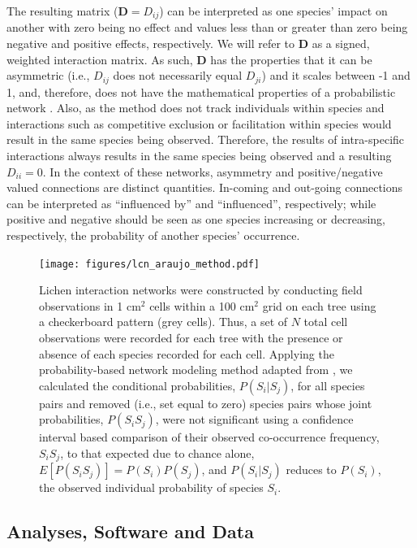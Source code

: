\documentclass[fleqn,12pt]{olplainarticle}
\begin{document}
The resulting matrix ($\mathbf{D} = D_{ij}$) can be interpreted as one
species' impact on another with zero being no effect and values less
than or greater than zero being negative and positive effects,
respectively. We will refer to $\mathbf{D}$ as a signed, weighted
interaction matrix. As such, $\mathbf{D}$ has the properties that it
can be asymmetric (i.e., $D_{ij}$ does not necessarily equal $D_{ji}$)
and it scales between -1 and 1, and, therefore, does not have the
mathematical properties of a probabilistic network
\citep{Poisot2016TheNetworks}. Also, as the method does not track
individuals within species and interactions such as competitive
exclusion or facilitation within species would result in the same
species being observed. Therefore, the results of intra-specific
interactions always results in the same species being observed and a
resulting $D_{ii} = 0$. In the context of these networks, asymmetry
and positive/negative valued connections are distinct
quantities. In-coming and out-going connections can be interpreted as
``influenced by'' and ``influenced'', respectively; while positive and
negative should be seen as one species increasing or decreasing,
respectively, the probability of another species' occurrence.

\begin{figure}[ht]
\centering
\texttt{[image: figures/lcn\_araujo\_method.pdf]}
\caption{Lichen interaction networks were constructed by conducting
  field observations in 1 cm$^2$ cells within a 100 cm$^2$ grid on each
  tree using a checkerboard pattern (grey cells). Thus, a set of $N$
  total cell observations were recorded for each tree with the
  presence or absence of each species recorded for each cell. Applying
  the probability-based network modeling method adapted from
  \citep{Araujo2011}, we calculated the conditional probabilities,
  $P(S_i|S_j)$, for all species pairs and removed (i.e., set equal to
  zero) species pairs whose joint probabilities, $P(S_i S_j)$, were
  not significant using a confidence interval based comparison of
  their observed co-occurrence frequency, $S_iS_j$, to that expected
  due to chance alone, $E[P(S_iS_j)] = P(S_i) P(S_j)$, and
  $P(S_i|S_j)$ reduces to $P(S_i)$, the observed individual
  probability of species $S_i$.}
\label{fig:conet_method}
\end{figure}


\subsection*{Analyses, Software and Data}
\end{document}
